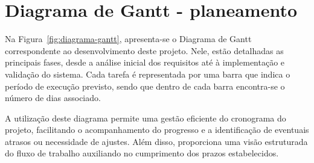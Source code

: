 








\section{Diagrama de Gantt - planeamento}
\label{capitulo3:Diagrama-gantt}

Na Figura~\ref{fig:diagrama-gantt}, apresenta-se o Diagrama de Gantt correspondente ao desenvolvimento deste projeto. Nele, estão detalhadas as principais fases, desde a análise inicial dos requisitos até à implementação e validação do sistema. Cada tarefa é representada por uma barra que indica o período de execução previsto, sendo que dentro de cada barra encontra-se o número de dias associado.

A utilização deste diagrama permite uma gestão eficiente do cronograma do projeto, facilitando o acompanhamento do progresso e a identificação de eventuais atrasos ou necessidade de ajustes. Além disso, proporciona uma visão estruturada do fluxo de trabalho auxiliando no cumprimento dos prazos estabelecidos.

